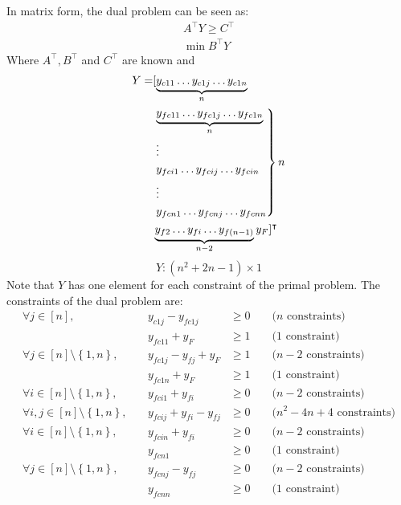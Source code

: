 In matrix form, the dual problem can be seen as:
\begin{equation*}
\begin{gathered}
  A^\intercal Y \geq C^\intercal \\
  \min{B^\intercal Y}
\end{gathered}
\end{equation*}
Where $A^\intercal, B^\intercal$ and $C^\intercal$ are known and
\begin{align*}
  Y = &[\underbrace{y_{c11} \dots y_{c1j} \dots y_{c1n}}_{n} \\
    &\begin{rcases}
      \underbrace{y_{fc11} \dots y_{fc1j} \dots y_{fc1n}}_{n} \\
      \vdots \\
      y_{fci1} \dots y_{fcij} \dots y_{fcin} \\
      \vdots \\
      y_{fcn1} \dots y_{fcnj} \dots y_{fcnn}
    \end{rcases} n \\
    &\underbrace{y_{f2} \dots y_{fi} \dots y_{f\left(n-1\right)}}_{n-2} y_F ]^\intercal
\end{align*}
\begin{equation*}
  Y : \left(n^2 + 2n - 1\right) \times 1
\end{equation*}
Note that $Y$ has one element for each constraint of the primal problem. The constraints of the dual problem are:
\begin{equation}
\label{lp:dual:constraints}
\begin{alignedat}{4}
  \forall j \in \left[n\right], && y_{c1j} - y_{fc1j} &\geq 0 &&\mbox{ ($n$ constraints)} \\
  && y_{fc11} + y_F &\geq 1 &&\mbox{ (1 constraint)} \\
  \forall j \in \left[n\right] \setminus \left\{1, n\right\}, &\:& y_{fc1j} - y_{fj} + y_F &\geq 1 &&
    \mbox{ ($n - 2$ constraints)} \\
  && y_{fc1n} + y_F &\geq 1 &&\mbox{ (1 constraint)} \\
  \forall i \in \left[n\right] \setminus \left\{1, n\right\}, && y_{fci1} + y_{fi} &\geq 0 &&
    \mbox{ ($n - 2$ constraints)} \\
  \forall i, j \in \left[n\right] \setminus \left\{1, n\right\}, &\:& y_{fcij} + y_{fi} - y_{fj} &\geq 0 &&
    \mbox{ ($n^2 - 4n + 4$ constraints)} \\
  \forall i \in \left[n\right] \setminus \left\{1, n\right\}, && y_{fcin} + y_{fi} &\geq 0 &&
    \mbox{ ($n - 2$ constraints)} \\
  && y_{fcn1} &\geq 0 &&\mbox{ (1 constraint)} \\
  \forall j \in \left[n\right] \setminus \left\{1, n\right\}, && y_{fcnj} - y_{fj} &\geq 0 &&
    \mbox{ ($n - 2$ constraints)} \\
  && y_{fcnn} &\geq 0 &&\mbox{ (1 constraint)} \\
\end{alignedat}
\end{equation}
